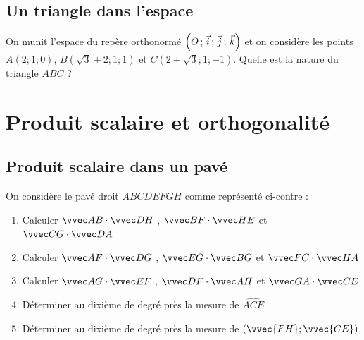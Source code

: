 \documentclass[oneside,12pt]{book}          %
\begin{document}
\subsection{Un triangle dans l'espace}
On munit l'espace du repère orthonormé $\left(O\,;\,\Vec{i}\,;\,\Vec{j}\,;\,\Vec{k}\right)$ et on considère les points $A(2;1;0)$, $ B(\sqrt{3}+2;1;1)$ et $C(2+\sqrt{3};1;-1)$. Quelle est la nature du triangle $ABC$ ?



\section{Produit scalaire et orthogonalité}

\subsection{Produit scalaire dans un pavé}

\begin{minipage}{0.65\textwidth}
    On considère le pavé droit $ABCDEFGH$ comme représenté ci-contre :
    \begin{enumerate}
        \item Calculer $\scal{AB}{DH}$ , $\scal{BF}{HE}$ et $\scal{CG}{DA}$
        \item Calculer $\scal{AF}{DG}$ , $\scal{EG}{BG}$ et $\scal{FC}{HA}$
        \item Calculer $\scal{AG}{EF}$ , $\scal{DF}{AH}$ et $\scal{GA}{CE}$
        \item Déterminer au dixième de degré près la mesure de $\widehat{ACE}$
        \item Déterminer au dixième de degré près la mesure de $(\vvec{FH};\vvec{CE})$
    \end{enumerate}
\end{minipage}
\begin{minipage}{0.34\textwidth}
\end{minipage}
\end{document}
